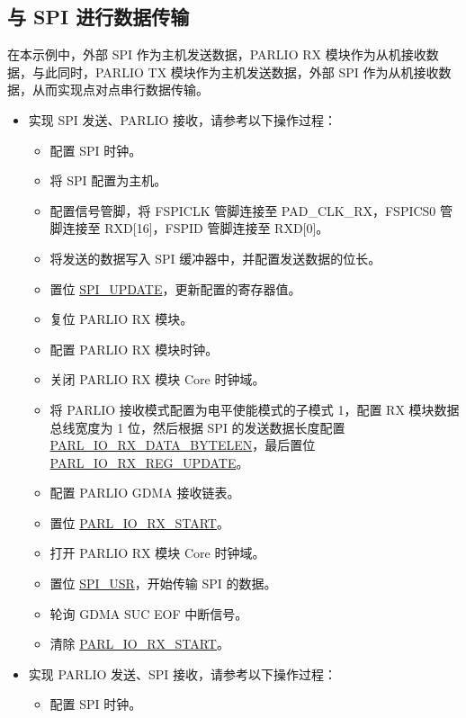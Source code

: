 \documentclass[main\_\_CN.tex]{subfiles}
\begin{document}
\subsection{与 SPI 进行数据传输}

在本示例中，外部 SPI 作为主机发送数据，PARLIO RX 模块作为从机接收数据，与此同时，PARLIO TX 模块作为主机发送数据，外部 SPI 作为从机接收数据，从而实现点对点串行数据传输。

\begin{itemize}
    \item 实现 SPI 发送、PARLIO 接收，请参考以下操作过程：
    \begin{itemize}
        \item 配置 SPI 时钟。
        \item 将 SPI 配置为主机。
        \item 配置信号管脚，将 FSPICLK 管脚连接至 PAD\_CLK\_RX，FSPICS0 管脚连接至 RXD[16]，FSPID 管脚连接至 RXD[0]。 
        \item 将发送的数据写入 SPI 缓冲器中，并配置发送数据的位长。
        \item 置位 \hyperref[fielddesc:SPIUPDATE]{SPI\_UPDATE}，更新配置的寄存器值。
        \item 复位 PARLIO RX 模块。
        \item 配置 PARLIO RX 模块时钟。
        \item 关闭 PARLIO RX 模块 Core 时钟域。
        \item 将 PARLIO 接收模式配置为电平使能模式的子模式 1，配置 RX 模块数据总线宽度为 1 位，然后根据 SPI 的发送数据长度配置 \hyperref[fielddesc:PARLIORXDATABYTELEN]{PARL\_IO\_RX\_DATA\_BYTELEN}，最后置位 \hyperref[fielddesc:PARLIORXREGUPDATE]{PARL\_IO\_RX\_REG\_UPDATE}。
        \item 配置 PARLIO GDMA 接收链表。
        \item 置位 \hyperref[fielddesc:PARLIORXSTART]{PARL\_IO\_RX\_START}。
        \item 打开 PARLIO RX 模块 Core 时钟域。
        \item 置位 \hyperref[fielddesc:SPIUSR]{SPI\_USR}，开始传输 SPI 的数据。
        \item 轮询 GDMA SUC EOF 中断信号。
        \item 清除 \hyperref[fielddesc:PARLIORXSTART]{PARL\_IO\_RX\_START}。
    \end{itemize} 
    \item 实现 PARLIO 发送、SPI 接收，请参考以下操作过程：
    \begin{itemize}
        \item 配置 SPI 时钟。

\end{itemize}
\end{itemize}
\end{document}

